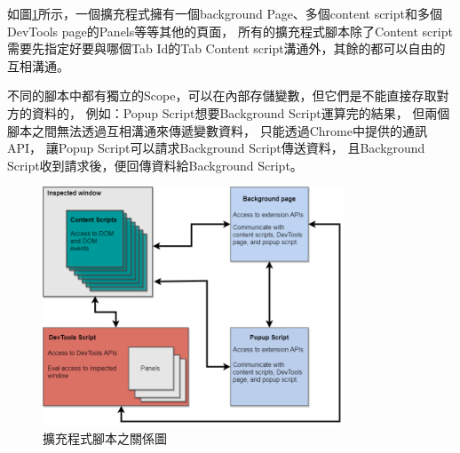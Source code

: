 如圖\ref{f2.3}所示，一個擴充程式擁有一個background Page、多個content script和多個DevTools page的Panels等等其他的頁面，
所有的擴充程式腳本除了Content script需要先指定好要與哪個Tab Id的Tab Content script溝通外，其餘的都可以自由的互相溝通。

不同的腳本中都有獨立的Scope，可以在內部存儲變數，但它們是不能直接存取對方的資料的，
例如：Popup Script想要Background Script運算完的結果，
但兩個腳本之間無法透過互相溝通來傳遞變數資料，
只能透過Chrome中提供的通訊API，
讓Popup Script可以請求Background Script傳送資料，
且Background Script收到請求後，便回傳資料給Background Script。

\begin{figure}[H]
    \centering
    \includegraphics[width=0.8\textwidth]{picture/ch2-extension-script-relation.png}
    \caption{擴充程式腳本之關係圖}
    \label{f2.3}
\end{figure}